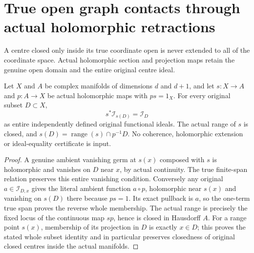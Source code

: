 \section{True open graph contacts through actual holomorphic retractions}

A centre closed only inside its true coordinate open is never extended to
all of the coordinate space. Actual holomorphic section and projection maps
retain the genuine open domain and the entire original centre ideal.

\begin{theorem}
\label{hir:actual-retract-contact-centre-whole-ideal}
\leanok
Let $X$ and $A$ be complex manifolds of dimensions $d$ and $d+1$,
and let $s:X\to A$ and $p:A\to X$ be actual holomorphic maps with
$ps=1_X$. For every original subset $D\subset X$,
\[
 s^*\mathcal I_{s(D)}=\mathcal I_D
\]
as entire independently defined original functional ideals. The actual
range of $s$ is closed, and $s(D)=\operatorname{range}(s)\cap p^{-1}D$.
No coherence, holomorphic extension or ideal-equality certificate is input.
\end{theorem}
\begin{proof}
A genuine ambient vanishing germ at $s(x)$ composed with $s$ is holomorphic
and vanishes on $D$ near $x$, by actual continuity. The true finite-span
relation preserves this entire vanishing condition. Conversely any original
$a\in\mathcal I_{D,x}$ gives the literal ambient function $a\circ p$,
holomorphic near $s(x)$ and vanishing on $s(D)$ there because $ps=1$.
Its exact pullback is $a$, so the one-term true span proves the reverse
whole membership. The actual range is precisely the fixed locus of the
continuous map $sp$, hence is closed in Hausdorff $A$. For a range point
$s(x)$, membership of its projection in $D$ is exactly $x\in D$; this
proves the stated whole subset identity and in particular preserves
closedness of original closed centres inside the actual manifolds.
\end{proof}

